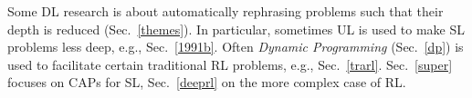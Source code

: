 \documentclass[letterpaper]{article}
\begin{document}
\begin{CJK*}{UTF8}{gbsn}
Some DL research is about automatically rephrasing problems such that their
 depth is reduced (Sec.~\ref{themes}).
In particular,
sometimes UL is used to make SL problems less deep, e.g., Sec.~\ref{1991b}.
Often {\em Dynamic Programming} (Sec.~\ref{dp}) is used to facilitate certain traditional
RL problems, e.g., Sec.~\ref{trarl}.
Sec.~\ref{super} focuses on CAPs for
SL, Sec.~\ref{deeprl} on the more complex case of RL. 




%
%
%
%
%
\end{CJK*}
\end{document}
